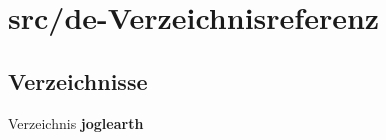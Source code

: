 \section{src/de-\/\-Verzeichnisreferenz}
\label{dir_d6db364fa2af4f813590f90c1384da9a}
\subsection*{Verzeichnisse}
\begin{DoxyCompactItemize}
\item 
Verzeichnis {\bf joglearth}
\end{DoxyCompactItemize}
